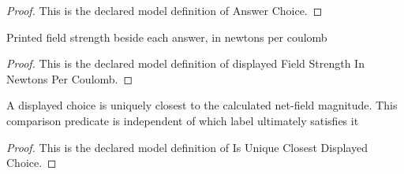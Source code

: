 \begin{proof}
  This is the declared model definition of Answer Choice.
\end{proof}
\begin{definition}
  \label{def:physics:phyx-mini-0833:phyxminiproblems-problemphyxmini0833-displayedfieldstrengthinnewtonspercoulomb}
  Printed field strength beside each answer, in newtons per coulomb
\end{definition}
\begin{proof}
  This is the declared model definition of displayed Field Strength In Newtons Per Coulomb.
\end{proof}
\begin{definition}
  \label{def:physics:phyx-mini-0833:phyxminiproblems-problemphyxmini0833-isuniqueclosestdisplayedchoice}
  A displayed choice is uniquely closest to the calculated net-field magnitude. This comparison predicate is independent of which label ultimately satisfies it
\end{definition}
\begin{proof}
  This is the declared model definition of Is Unique Closest Displayed Choice.
\end{proof}
